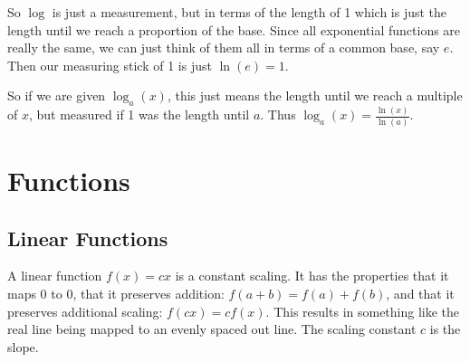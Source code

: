 \documentclass[12pt]{article}
\begin{document}
So \( \log \) is just a measurement, but in terms of the length of 1
which is just the length until we reach a proportion of the base.
Since all exponential functions are really the same,
we can just think of them all in terms of a common base, say \( e \).
Then our measuring stick of 1 is just \( \ln(e) = 1\).

So if we are given \( \log_a(x) \), this just means
the length until we reach a multiple of \( x \),
but measured if 1 was the length until \( a \).
Thus \( \log_a(x) = \frac{\ln(x)}{\ln(a)} \).


\newpage
\section{Functions}

\subsection{Linear Functions}

A linear function \( f(x) = cx \) is a constant scaling.
It has the properties that it maps 0 to 0,
that it preserves addition: \( f(a+b) = f(a) + f(b) \),
and that it preserves additional scaling: \( f(cx) = cf(x) \).
This results in something like the real line being mapped to an evenly spaced out line.
The scaling constant \( c \) is the slope.

\end{document}
